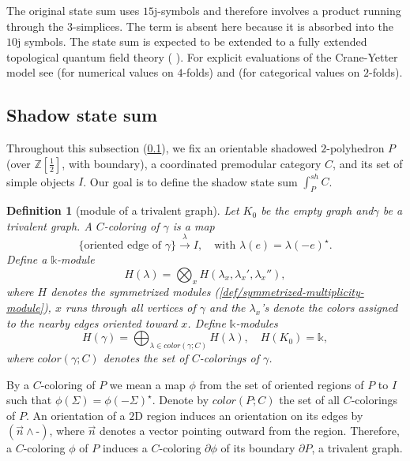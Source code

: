 \documentclass[12pt]{extarticle}
\numberwithin{equation}{section} %
\theoremstyle{mystyle}
\newtheorem{definition}[equation]{Definition}
\begin{document}
\noindent The original state sum uses $15$j-symbols and therefore
involves a product running through the $3$-simplices. The term is
absent here because it is absorbed into the $10$j symbols. The
state sum is expected to be extended to a fully extended
topological quantum field theory (\cite[section 1.5]{bjs2018}
\cite{cooke2019excision}
\cite{integrating-quantum-groups-over-surfaces}
\cite{fac-homo--kirillov-tham}). For explicit evaluations of the
Crane-Yetter model see \cite{barenz/evaluation-crane-yetter} (for
numerical values on $4$-folds) and
\cite{guu/higher-genera-center} (for categorical values on
$2$-folds).

\subsection{Shadow state sum} \label{subsection/shadow-state-sum}

Throughout this subsection (\ref{subsection/shadow-state-sum}),
we fix an orientable shadowed $2$-polyhedron $P$ (over
$\mathbb{Z}[\frac{1}{2}]$, with boundary), a coordinated
premodular category $C$, and its set of simple objects $I$. Our
goal is to define the shadow state sum $\int_{P}^{sh} C$.

\begin{definition}[module of a trivalent graph]\label{def/module-of-a-trivalent-graph}
  Let $K_{0}$ be the empty graph and$\gamma$ be a trivalent
  graph. A $C$-coloring of $\gamma$ is a map
  $$\{\mbox{oriented edge of } \gamma\} \xrightarrow{\lambda} I, \quad \mbox{with } \lambda(e) = \lambda(-e)^{\star}.$$
  Define a $\mathbb{k}$-module
  $$H(\lambda) = \bigotimes_{x} H(\lambda_{x}, \lambda_{x}', \lambda_{x}''),$$
  where $H$ denotes the symmetrized modules
  (\ref{def/symmetrized-multiplicity-module}), $x$ runs through
  all vertices of $\gamma$ and the $\lambda_{x}$'s denote the
  colors assigned to the nearby edges oriented toward $x$.
  Define $\mathbb{k}$-modules
  $$H(\gamma) = \bigoplus_{\lambda \in color(\gamma; C)} H(\lambda), \quad H(K_{0}) = \mathbb{k},$$
  where $color(\gamma; C)$ denotes the set of $C$-colorings of
  $\gamma$.
\end{definition}

By a $C$-coloring of $P$ we mean a map $\phi$ from the set of
oriented regions of $P$ to $I$ such that
$\phi(\Sigma) = \phi(-\Sigma)^{\star}$. Denote by $color(P; C)$
the set of all $C$-colorings of $P$. An orientation of a $2$D
region induces an orientation on its edges by
$(\vec{n} \wedge \text{-})$, where $\vec{n}$ denotes a vector
pointing outward from the region. Therefore, a $C$-coloring
$\phi$ of $P$ induces a $C$-coloring $\partial \phi$ of its
boundary $\partial P$, a trivalent graph.
\end{document}
